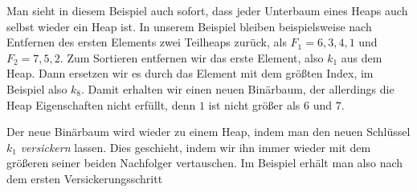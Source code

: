 \documentclass[tikz,12pt]{article}
\begin{document}
Man sieht in diesem Beispiel auch sofort, dass jeder Unterbaum eines Heaps auch selbst wieder ein Heap ist. 
In unserem Beispiel bleiben beispielsweise nach Entfernen des ersten Elements zwei Teilheaps zurück, als $F_1 = 6,3,4,1$ und $F_2 = 7,5,2$.
Zum Sortieren entfernen wir das erste Element, also $k_1$ aus dem Heap.
Dann ersetzen wir es durch das Element mit dem größten Index, im Beispiel also $k_8$. 
Damit erhalten wir einen neuen Binärbaum, der allerdings die Heap Eigenschaften nicht erfüllt, denn $1$ ist nicht größer als $6$ und $7$. 
\begin{center}
\end{center}
Der neue Binärbaum wird wieder zu einem Heap, indem man den neuen Schlüssel $k_1$ \emph{versickern} lassen.
Dies geschieht, indem wir ihn immer wieder mit dem größeren seiner beiden Nachfolger vertauschen.
Im Beispiel erhält man also nach dem ersten Versickerungsschritt
\begin{center}
\end{center}
\end{document}
